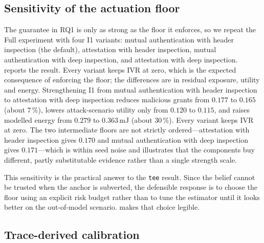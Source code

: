 

\subsection{Sensitivity of the actuation floor}
\label{sec:rq5-floor}

The guarantee in RQ1 is only as strong as the floor it enforces, so we repeat
the Full experiment with four I1 variants: mutual authentication with header
inspection (the default), attestation with header inspection, mutual
authentication with deep inspection, and attestation with deep inspection.
 reports the result. Every variant keeps IVR at zero, which is
the expected consequence of enforcing the floor; the differences are in residual
exposure, utility and energy. Strengthening I1 from mutual authentication with
header inspection to attestation with deep inspection reduces malicious grants
from $0.177$ to $0.165$ (about $7\,\%$), lowers attack-scenario utility only
from $0.120$ to $0.115$, and raises modelled energy from $0.279$ to
$0.363$\,mJ (about $30\,\%$). Every variant keeps IVR at zero. The two
intermediate floors are not strictly ordered---attestation with header inspection
gives $0.170$ and mutual authentication with deep inspection gives $0.171$---which
is within seed noise and illustrates that the components buy different, partly
substitutable evidence rather than a single strength scale.

This sensitivity is the practical answer to the \texttt{tee} result. Since the
belief cannot be trusted when the anchor is subverted, the defensible response is
to choose the floor using an explicit risk budget rather than to tune the
estimator until it looks better on the out-of-model scenario. 
makes that choice legible.



\subsection{Trace-derived calibration}
\label{sec:trace}

